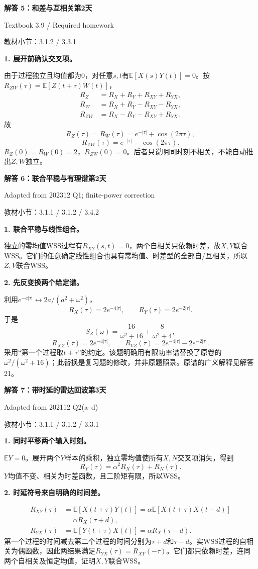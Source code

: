 \documentclass[10.5pt,fontset=fandol]{ctexart}
\newcommand{\E}{\mathbb E}\newcommand{\ee}{\mathrm e}\newcommand{\jj}{\mathrm j}
\newcommand{\qtitle}[2]{\par\addvspace{.85em}\Needspace{10\baselineskip}\begin{tcolorbox}[colback=navy,colframe=navy,arc=1.5pt,boxrule=0pt]\color{white}\large\bfseries #1\hfill\small #2\end{tcolorbox}}
\newcommand{\step}[1]{\par\addvspace{.4em}\Needspace{4\baselineskip}\textbf{#1}\par}\hypersetup{pdftitle={SSA Chapter 3 Review Solutions - Chinese}}
\begin{document}
\qtitle{解答 5：和差与互相关}{第2天}
{\small\color{accentred}Textbook 3.9 / Required homework}\par{\small\color{muted}教材小节：3.1.2 / 3.3.1}\par\smallskip\step{1. 展开前确认交叉项。}
由于过程独立且均值都为0，对任意$s,t$有$\E[X(s)Y(t)]=0$。按$R_{ZW}(\tau)=\E[Z(t+\tau)W(t)]$，
\[\begin{aligned}
R_Z&=R_X+R_Y+R_{XY}+R_{YX},\\
R_W&=R_X+R_Y-R_{XY}-R_{YX},\\
R_{ZW}&=R_X-R_Y-R_{XY}+R_{YX}.
\end{aligned}\]
故
\[\boxed{R_Z(\tau)=R_W(\tau)=e^{-|\tau|}+\cos(2\pi\tau)},\]
\[\boxed{R_{ZW}(\tau)=e^{-|\tau|}-\cos(2\pi\tau)}.\]
$R_Z(0)=R_W(0)=2$，$R_{ZW}(0)=0$。后者只说明同时刻不相关，不能自动推出$Z,W$独立。

\qtitle{解答 6：联合平稳与有理谱}{第2天}
{\small\color{accentred}Adapted from 202312 Q1; finite-power correction}\par{\small\color{muted}教材小节：3.1.1 / 3.1.2 / 3.4.2}\par\smallskip\step{1. 联合平稳与线性组合。}
独立的零均值WSS过程有$R_{XY}(s,t)=0$，两个自相关只依赖时差，故$X,Y$联合WSS。它们的任意确定线性组合也具有常均值、时差型的全部自/互相关，所以$Z,V$联合WSS。
\step{2. 先反变换两个给定谱。}
利用$e^{-a|\tau|}\leftrightarrow2a/(a^2+\omega^2)$，
\[R_X(\tau)=2e^{-4|\tau|},\qquad R_Y(\tau)=2e^{-2|\tau|}.\]
于是
\[\boxed{S_Z(\omega)=\frac{16}{\omega^2+16}+\frac8{\omega^2+4}},\]
\[\boxed{R_{XZ}(\tau)=2e^{-4|\tau|}},\qquad
\boxed{R_{VZ}(\tau)=2e^{-4|\tau|}-2e^{-2|\tau|}}.\]
采用“第一个过程取$t+\tau$”的约定。该题明确用有限功率谱替换了原卷的$\omega^2/(\omega^2+16)$；此替换是复习题的修改，并非原题照录。原谱的广义解释见解答21。

\qtitle{解答 7：带时延的雷达回波}{第3天}
{\small\color{accentred}Adapted from 202112 Q2(a--d)}\par{\small\color{muted}教材小节：3.1.1 / 3.1.2 / 3.3.1}\par\smallskip\step{1. 同时平移两个输入时刻。}
$\E Y=0$。展开两个$Y$样本的乘积，独立零均值使所有$X,N$交叉项消失，得到
\[\boxed{R_Y(\tau)=\alpha^2R_X(\tau)+R_N(\tau)}.\]
$Y$均值不变、相关为时差函数，且二阶矩有限，所以WSS。
\step{2. 时延符号来自明确的时间差。}
\[\begin{aligned}R_{XY}(\tau)&=\E[X(t+\tau)Y(t)]
=\alpha\E[X(t+\tau)X(t-d)]\\&=\boxed{\alpha R_X(\tau+d)},\\
R_{YX}(\tau)&=\E[Y(t+\tau)X(t)]
=\boxed{\alpha R_X(\tau-d)}.
\end{aligned}\]
第一个过程的时间减去第二个过程的时间分别为$\tau+d$和$\tau-d$。实WSS过程的自相关为偶函数，因此两结果满足$R_{YX}(\tau)=R_{XY}(-\tau)$。它们都只依赖时差，连同两个自相关及恒定均值，证明$X,Y$联合WSS。
\end{document}
